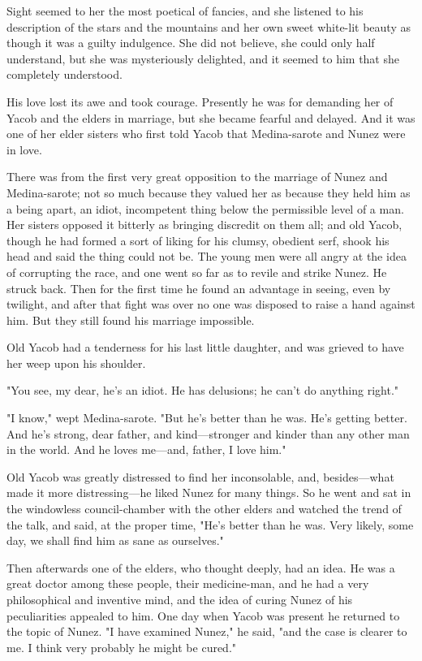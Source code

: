 \documentclass[submission]{sffms}
\begin{document}
Sight seemed to her the most poetical of fancies, and she listened to
his description of the stars and the mountains and her own sweet
white-lit beauty as though it was a guilty indulgence. She did not
believe, she could only half understand, but she was mysteriously
delighted, and it seemed to him that she completely understood.

His love lost its awe and took courage. Presently he was for demanding
her of Yacob and the elders in marriage, but she became fearful and
delayed. And it was one of her elder sisters who first told Yacob that
Medina-sarote and Nunez were in love.

There was from the first very great opposition to the marriage of
Nunez and Medina-sarote; not so much because they valued her as
because they held him as a being apart, an idiot, incompetent thing
below the permissible level of a man.  Her sisters opposed it bitterly
as bringing discredit on them all; and old Yacob, though he had formed
a sort of liking for his clumsy, obedient serf, shook his head and
said the thing could not be. The young men were all angry at the idea
of corrupting the race, and one went so far as to revile and strike
Nunez. He struck back. Then for the first time he found an advantage
in seeing, even by twilight, and after that fight was over no one was
disposed to raise a hand against him. But they still found his
marriage impossible.

Old Yacob had a tenderness for his last little daughter, and was
grieved to have her weep upon his shoulder.

"You see, my dear, he's an idiot. He has delusions; he can't do
anything right."

"I know," wept Medina-sarote. "But he's better than he was. He's
getting better.  And he's strong, dear father, and kind---stronger and
kinder than any other man in the world. And he loves me---and, father,
I love him."

Old Yacob was greatly distressed to find her inconsolable, and,
besides---what made it more distressing---he liked Nunez for many
things. So he went and sat in the windowless council-chamber with the
other elders and watched the trend of the talk, and said, at the
proper time, "He's better than he was. Very likely, some day, we shall
find him as sane as ourselves."

Then afterwards one of the elders, who thought deeply, had an idea. He
was a great doctor among these people, their medicine-man, and he had
a very philosophical and inventive mind, and the idea of curing Nunez
of his peculiarities appealed to him. One day when Yacob was present
he returned to the topic of Nunez. "I have examined Nunez," he said,
"and the case is clearer to me. I think very probably he might be
cured."
\end{document}
